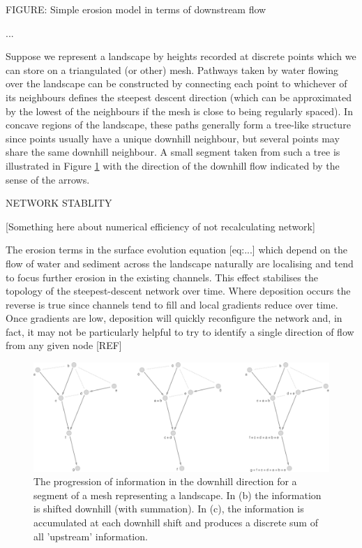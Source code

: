 \documentclass[draft,jgrga]{agu_template/AGUTeX}
\begin{document}
FIGURE: Simple erosion model in terms of downstream flow

... 

Suppose we represent a landscape by heights recorded at discrete points which we can store on a triangulated (or other) mesh. Pathways taken by water flowing over the landscape can be constructed by connecting each point to whichever of its neighbours defines the steepest descent direction (which can be approximated by the lowest of the neighbours if the mesh is close to being regularly spaced). In concave regions of the landscape, these paths generally form a tree-like structure since points usually have a unique downhill neighbour, but several points may share the same downhill neighbour. A small segment taken from such a tree is illustrated in Figure \ref{fig:Tree} with the direction of the downhill flow indicated by the sense of the arrows.  

NETWORK STABLITY

[Something here about numerical efficiency of not recalculating network]

The erosion terms in the surface evolution equation [eq:...] which depend on the flow of water and sediment across the landscape naturally are localising and tend to focus further erosion in the existing channels. This effect stabilises the topology of the steepest-descent network over time. Where deposition occurs the reverse is true since channels tend to fill and local gradients reduce over time. Once gradients are low, deposition will quickly reconfigure the network and, in fact, it may not be particularly helpful to try to identify a single direction of flow from any given node [REF]


\begin{figure}[hbt]
  \includegraphics[width=0.9\linewidth]{FigurePDFs/Network.pdf} 
  \caption{\label{fig:Tree} The progression of information in the downhill direction for a segment of 
  a mesh representing a landscape. In (b) the information is shifted downhill (with summation). In (c), the information is accumulated at each downhill shift and produces a discrete sum of all 'upstream' information.}
\end{figure}
\end{document}
